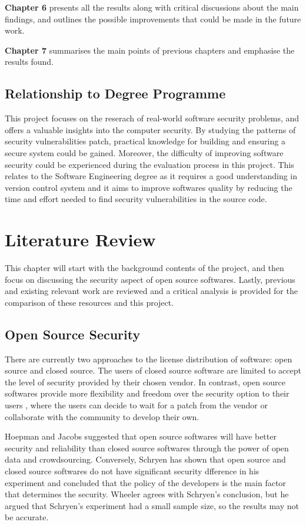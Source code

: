 \documentclass[12pt, a4paper]{report}
\begin{document}
\noindent\textbf{Chapter 6} presents all the results along with critical discussions about the main
findings,	and outlines the possible improvements that could be made in the future work.

\noindent\textbf{Chapter 7} summarises the main points of previous chapters and emphasise the
results found.

\section{Relationship to Degree Programme}
This project focuses on the reserach of real-world software security problems, and offers a valuable
insights into the computer security. By studying the patterns of security vulnerabilities patch,
practical knowledge for building and ensuring a secure system could be gained. Moreover, the
difficulty of improving software security could be experienced during the evaluation process in this
project. This relates to the Software Engineering degree as it requires a good understanding in
version control system and it aims to improve softwares quality by reducing the time and effort
needed to find security vulnerabilities in the source code.

\chapter{Literature Review}
This chapter will start with the background contents of the project, and then focus on discussing
the security aspect of open source softwares. Lastly, previous and existing relevant work are
reviewed and a critical analysis is provided for the comparison of these resources and this project.

\section{Open Source Security}
There are currently two approaches to the license distribution of software: open source and closed
source. The users of closed source software are limited to accept the level of security
provided by their chosen vendor. In contrast, open source softwares provide more flexibility and
freedom over the security option to their users \cite{payne_2002}, where the users can decide to
wait for a patch from the vendor or collaborate with the community to develop their own.

Hoepman and Jacobs \cite{hoepman_2007} suggested that open source softwares will have better
security and reliability than closed source softwares through the power of open data and
crowdsourcing. Conversely, Schryen \cite{schryen_2011} has shown that open source and closed source
softwares do not have significant security dfference in his experiment and concluded that the policy
of the developers is the main factor that determines the security. Wheeler \cite{wheeler_2015}
agrees with Schryen's conclusion, but he argued that Schryen's experiment had a small sample size,
so the results may not be accurate.
\end{document}
